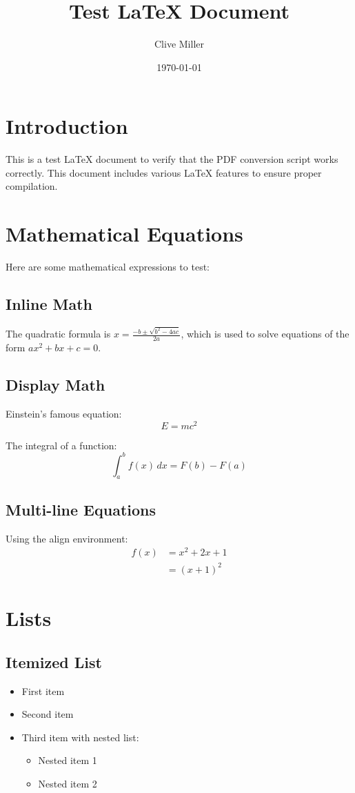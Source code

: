 \documentclass[12pt,a4paper]{article}
\title{Test LaTeX Document}
\author{Clive Miller}
\date{\today}
\begin{document}
\maketitle

\tableofcontents
\newpage

\section{Introduction}
This is a test LaTeX document to verify that the PDF conversion script works correctly. This document includes various LaTeX features to ensure proper compilation.

\section{Mathematical Equations}
Here are some mathematical expressions to test:

\subsection{Inline Math}
The quadratic formula is $x = \frac{-b \pm \sqrt{b^2 - 4ac}}{2a}$, which is used to solve equations of the form $ax^2 + bx + c = 0$.

\subsection{Display Math}
Einstein's famous equation:
\[
E = mc^2
\]

The integral of a function:
\[
\int_{a}^{b} f(x) \, dx = F(b) - F(a)
\]

\subsection{Multi-line Equations}
Using the align environment:
\begin{align}
f(x) &= x^2 + 2x + 1 \\
     &= (x + 1)^2
\end{align}

\section{Lists}

\subsection{Itemized List}
\begin{itemize}
    \item First item
    \item Second item
    \item Third item with nested list:
    \begin{itemize}
        \item Nested item 1
        \item Nested item 2
    \end{itemize}
\end{itemize}
\end{document}
